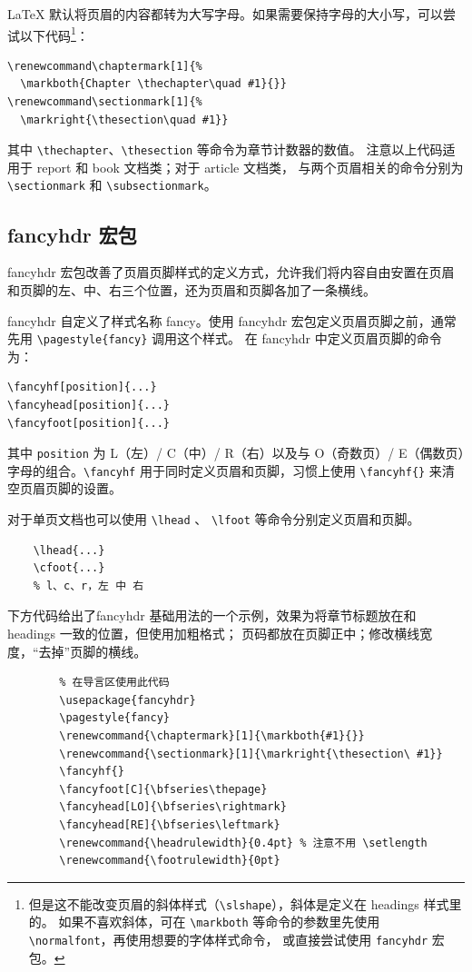 \LaTeX{} 默认将页眉的内容都转为大写字母。如果需要保持字母的大小写，可以尝试以下代码\footnote{但是这不能改变页眉的斜体样式（\lstinline{\slshape}），斜体是定义在 {headings} 样式里的。
如果不喜欢斜体，可在 \lstinline{\markboth} 等命令的参数里先使用 \lstinline{\normalfont}，再使用想要的字体样式命令，
或直接尝试使用 \lstinline{fancyhdr} 宏包。}：
\begin{lstlisting}
\renewcommand\chaptermark[1]{%
  \markboth{Chapter \thechapter\quad #1}{}}
\renewcommand\sectionmark[1]{%
  \markright{\thesection\quad #1}}
\end{lstlisting}

其中 \lstinline{\thechapter}、\lstinline{\thesection} 等命令为章节计数器的数值。
注意以上代码适用于 {report} 和 {book} 文档类；对于 {article} 文档类，
与两个页眉相关的命令分别为 \lstinline{\sectionmark} 和 \lstinline{\subsectionmark}。

\subsection{{fancyhdr} 宏包}\label{subsec:fancyhdr}

{fancyhdr} 宏包改善了页眉页脚样式的定义方式，允许我们将内容自由安置在页眉和页脚的左、中、右三个位置，还为页眉和页脚各加了一条横线。

{fancyhdr} 自定义了样式名称 {fancy}。使用 {fancyhdr} 宏包定义页眉页脚之前，通常先用 \lstinline|\pagestyle{fancy}| 调用这个样式。
在 {fancyhdr} 中定义页眉页脚的命令为：
\begin{lstlisting}
\fancyhf[position]{...}
\fancyhead[position]{...}
\fancyfoot[position]{...}
\end{lstlisting}
其中 \lstinline{position} 为 L（左）/ C（中）/ R（右）以及与 O（奇数页）/ E（偶数页）字母的组合。\lstinline{\fancyhf} 用于同时定义页眉和页脚，习惯上使用 \lstinline|\fancyhf{}| 来清空页眉页脚的设置。

对于单页文档也可以使用 \lstinline{\lhead} 、 \lstinline{\lfoot} 等命令分别定义页眉和页脚。

\begin{lstlisting}
    \lhead{...}
    \cfoot{...}
    % l、c、r，左 中 右
\end{lstlisting}

下方代码给出了{fancyhdr} 基础用法的一个示例，效果为将章节标题放在和 headings 一致的位置，但使用加粗格式；
页码都放在页脚正中；修改横线宽度，“去掉”页脚的横线。

\begin{lstlisting}
        % 在导言区使用此代码
        \usepackage{fancyhdr}
        \pagestyle{fancy}
        \renewcommand{\chaptermark}[1]{\markboth{#1}{}}
        \renewcommand{\sectionmark}[1]{\markright{\thesection\ #1}}
        \fancyhf{}
        \fancyfoot[C]{\bfseries\thepage}
        \fancyhead[LO]{\bfseries\rightmark}
        \fancyhead[RE]{\bfseries\leftmark}
        \renewcommand{\headrulewidth}{0.4pt} % 注意不用 \setlength
        \renewcommand{\footrulewidth}{0pt}
\end{lstlisting}

